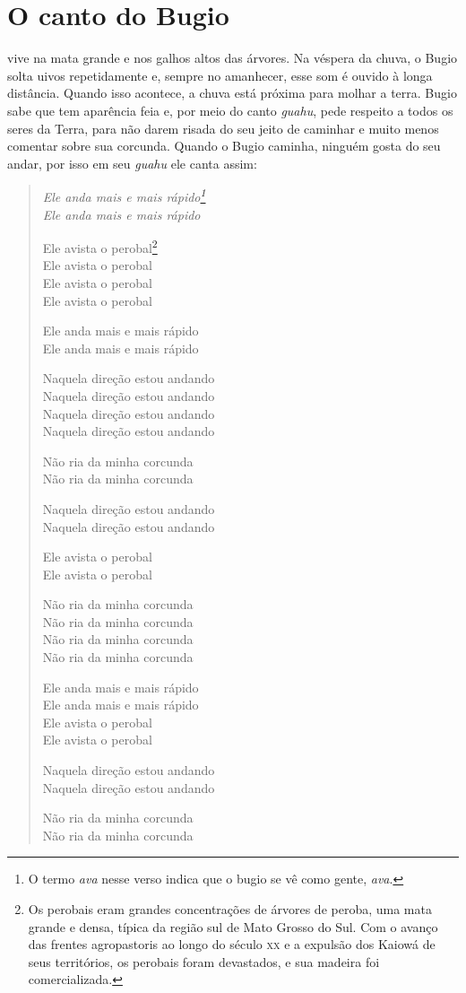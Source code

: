 \chapter{O canto do Bugio}

 vive na mata grande e nos galhos altos das árvores. Na véspera da
chuva, o Bugio solta uivos repetidamente e, sempre no amanhecer, esse
som é ouvido à longa distância. Quando isso acontece, a chuva está
próxima para molhar a terra. Bugio sabe que tem aparência feia e, por
meio do canto \emph{guahu}, pede respeito a todos os seres da Terra,
para não darem risada do seu jeito de caminhar e muito menos comentar
sobre sua corcunda. Quando o Bugio caminha, ninguém gosta do seu andar,
por isso em seu \emph{guahu} ele canta assim:

\begin{verse}
\itshape
Ele anda mais e mais rápido\footnote{O termo \emph{ava} nesse verso indica que o bugio se vê como gente, \emph{ava}.}\\
Ele anda mais e mais rápido

Ele avista o perobal\footnote{Os perobais eram grandes concentrações de árvores de peroba, uma mata grande e densa, típica da região sul de Mato Grosso do Sul. Com o avanço das frentes agropastoris ao longo do século \textsc{xx} e a expulsão dos Kaiowá de seus territórios, os perobais foram devastados, e sua madeira foi comercializada.}\\
Ele avista o perobal\\
Ele avista o perobal\\
Ele avista o perobal

Ele anda mais e mais rápido\\
Ele anda mais e mais rápido

Naquela direção estou andando\\
Naquela direção estou andando\\
Naquela direção estou andando\\
Naquela direção estou andando

Não ria da minha corcunda\\
Não ria da minha corcunda

Naquela direção estou andando\\
Naquela direção estou andando

Ele avista o perobal\\
Ele avista o perobal

Não ria da minha corcunda\\
Não ria da minha corcunda\\
Não ria da minha corcunda\\
Não ria da minha corcunda 

Ele anda mais e mais rápido\\
Ele anda mais e mais rápido\\
Ele avista o perobal\\
Ele avista o perobal

Naquela direção estou andando\\
Naquela direção estou andando

Não ria da minha corcunda\\
Não ria da minha corcunda
\end{verse}


